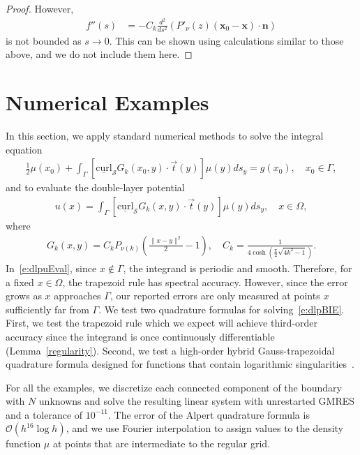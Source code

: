 \documentclass[final]{siamltex}
\newcommand{\C}{C_k}
\renewcommand{\S} {\mathcal{S}}
\begin{document}
\begin{proof}
However,
\begin{align*} 
  f''(s) &= -\C \frac{d^2}{ds^2}\left( P'_\nu(z) 
  (\mathbf{x}_{0}-\mathbf{x}) \cdot \mathbf{n} \right)
\end{align*}
is not bounded as $s\rightarrow 0$. This can be shown using calculations
similar to those above, and we do not include them here.
\end{proof}


\section{Numerical Examples}
\label{s:numerics}
In this section, we apply standard numerical methods to solve the
integral equation
\begin{align}
  \label{e:dlpBIE}
  \frac{1}{2}\mu(x_{0}) + \int_{\Gamma}
    [\underline{\mbox{curl}}_{\S}G_{k}(x_{0},y) \cdot
    \vec{t}(y)] \mu(y)ds_{y} = g(x_{0}), \quad x_{0} \in \Gamma,
\end{align}
and to evaluate the double-layer potential
\begin{align}
  \label{e:dlpuEval}
  u(x) = \int_{\Gamma} [\underline{\mbox{curl}}_{\S}G_{k}(x,y) 
    \cdot \vec{t}(y)] \mu(y)ds_{y}, \quad x \in \Omega,
\end{align}
where
\begin{align*}
  G_{k}(x,y) = \C P_{\nu(k)} \left(
    \frac{\|x - y\|^{2}}{2} - 1\right), \quad 
  \C = \frac{1}{4\cosh\left(\frac{\pi}{2}\sqrt{4k^{2}-1}\right)}.
\end{align*}
In~\eqref{e:dlpuEval}, since $x \notin \Gamma$, the integrand is
periodic and smooth.  Therefore, for a fixed $x\in \Omega$, the
trapezoid rule has spectral accuracy.  However, since the error grows as
$x$ approaches $\Gamma$, our reported errors are only measured at points
$x$ sufficiently far from $\Gamma$.  We test two quadrature formulas for
solving~\eqref{e:dlpBIE}.  First, we test the trapezoid rule which we
expect will achieve third-order accuracy since the integrand is once
continuously differentiable (Lemma~\ref{regularity}).  Second, we test a
high-order hybrid Gauss-trapezoidal quadrature formula designed for
functions that contain logarithmic singularities~\cite{alpert}.

For all the examples, we discretize each connected component of the
boundary with $N$ unknowns and solve the resulting linear system with
unrestarted GMRES and a tolerance of $10^{-11}$.  The error of the
Alpert quadrature formula is $\mathcal{O}(h^{16}\log h)$, and we use
Fourier interpolation to assign values to the density function $\mu$ at
points that are intermediate to the regular grid.
\end{document}
